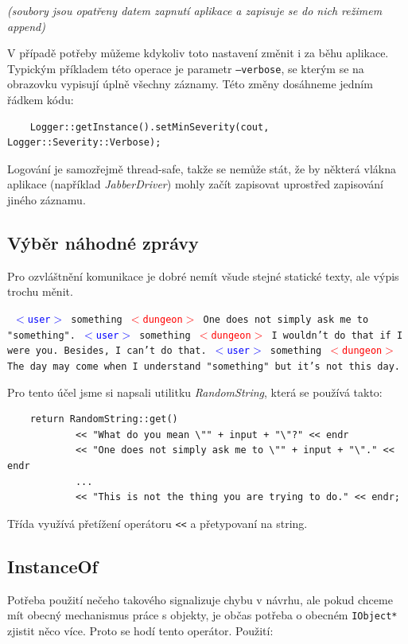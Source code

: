 \documentclass[11pt, a4paper]{article}
\def\class#1{\emph{#1}}
\newenvironment{example}%
{\smallskip\noindent\ignorespaces\obeylines\tt}%
{\smallskip\par\noindent
\ignorespacesafterend}
\def\user{\textcolor{blue}{$<$user$>$ }}
\def\dung{\textcolor{red}{$<$dungeon$>$ }}
\begin{document}
\noindent
\textit{(soubory jsou opatřeny datem zapnutí aplikace a zapisuje se do nich režimem append)}

\noindent
V případě potřeby můžeme kdykoliv toto nastavení změnit i za běhu aplikace. Typickým příkladem této operace je parametr \texttt{--verbose}, se kterým se na obrazovku vypisují úplně všechny záznamy. Této změny dosáhneme jedním řádkem kódu:

\begin{lstlisting}
    Logger::getInstance().setMinSeverity(cout, Logger::Severity::Verbose);
\end{lstlisting}

\noindent
Logování je samozřejmě thread-safe, takže se nemůže stát, že by některá vlákna aplikace (například \class{JabberDriver}) mohly začít zapisovat uprostřed zapisování jiného záznamu.

\subsection{Výběr náhodné zprávy}

Pro ozvláštnění komunikace je dobré nemít všude stejné statické texty, ale výpis trochu měnit.

\begin{example}
\user something
\dung One does not simply ask me to "something".
\user something
\dung I wouldn't do that if I were you. Besides, I can't do that.
\user something
\dung The day may come when I understand "something"{} but it's not 
this day.
\end{example}

\noindent Pro tento účel jsme si napsali utilitku \class{RandomString}, která se používá takto:

\begin{lstlisting}
	return RandomString::get()
		    << "What do you mean \"" + input + "\"?" << endr
		    << "One does not simply ask me to \"" + input + "\"." << endr
		    ...
			<< "This is not the thing you are trying to do." << endr;
\end{lstlisting}

\noindent Třída využívá přetížení operátoru \texttt{<<} a přetypovaní na string.

\subsection{InstanceOf}

Potřeba použití nečeho takového signalizuje chybu v návrhu, ale pokud chceme mít obecný mechanismus práce s objekty, je občas potřeba o obecném \texttt{IObject*} zjistit něco více. Proto se hodí tento operátor. Použití:
\end{document}
